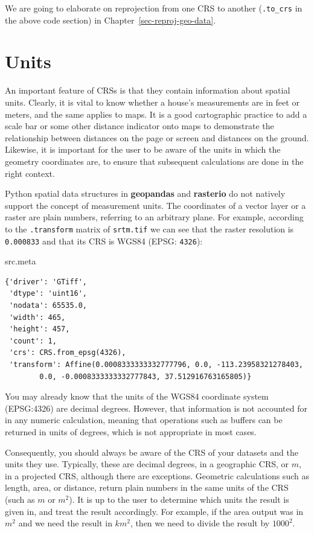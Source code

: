\documentclass[
  letterpaper,
]{krantz}
\newenvironment{Shaded}{\begin{snugshade}}{\end{snugshade}}
\newcommand{\NormalTok}[1]{\textcolor[rgb]{0.00,0.23,0.31}{#1}}
\begin{document}
We are going to elaborate on reprojection from one CRS to another
(\texttt{.to\_crs} in the above code section) in
Chapter~\ref{sec-reproj-geo-data}.

\section{Units}\label{units}

An important feature of CRSs is that they contain information about
spatial units. Clearly, it is vital to know whether a house's
measurements are in feet or meters, and the same applies to maps. It is
a good cartographic practice to add a scale bar or some other distance
indicator onto maps to demonstrate the relationship between distances on
the page or screen and distances on the ground. Likewise, it is
important for the user to be aware of the units in which the geometry
coordinates are, to ensure that subsequent calculations are done in the
right context.

Python spatial data structures in \textbf{geopandas} and
\textbf{rasterio} do not natively support the concept of measurement
units. The coordinates of a vector layer or a raster are plain numbers,
referring to an arbitrary plane. For example, according to the
\texttt{.transform} matrix of \texttt{srtm.tif} we can see that the
raster resolution is \texttt{0.000833} and that its CRS is WGS84 (EPSG:
\texttt{4326}):

\begin{Shaded}
\begin{Highlighting}[]
\NormalTok{src.meta}
\end{Highlighting}
\end{Shaded}

\begin{verbatim}
{'driver': 'GTiff',
 'dtype': 'uint16',
 'nodata': 65535.0,
 'width': 465,
 'height': 457,
 'count': 1,
 'crs': CRS.from_epsg(4326),
 'transform': Affine(0.0008333333332777796, 0.0, -113.23958321278403,
        0.0, -0.0008333333332777843, 37.512916763165805)}
\end{verbatim}

You may already know that the units of the WGS84 coordinate system
(EPSG:4326) are decimal degrees. However, that information is not
accounted for in any numeric calculation, meaning that operations such
as buffers can be returned in units of degrees, which is not appropriate
in most cases.

Consequently, you should always be aware of the CRS of your datasets and
the units they use. Typically, these are decimal degrees, in a
geographic CRS, or \(m\), in a projected CRS, although there are
exceptions. Geometric calculations such as length, area, or distance,
return plain numbers in the same units of the CRS (such as \(m\) or
\(m^2\)). It is up to the user to determine which units the result is
given in, and treat the result accordingly. For example, if the area
output was in \(m^2\) and we need the result in \(km^2\), then we need
to divide the result by \(1000^2\).
\end{document}
